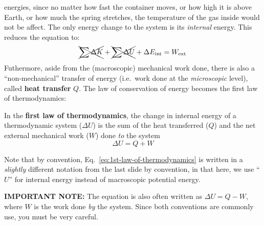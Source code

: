 energies, since no matter how fast the container moves, or how high it is above
Earth, or how much the spring stretches, the temperature of the gas inside would
not be affect. The only energy change to the system is its \emph{internal}
energy. This reduces the equation to:
\begin{equation}
  \xcancel{\sum\Delta K} + \xcancel{\sum\Delta U} + \Delta E_\text{int}=
  W_\text{ext}
\end{equation}
Futhermore, aside from the (macroscopic) mechanical work done, there is also a
``non-mechanical'' transfer of energy (i.e.\ work done at the
\emph{microscopic} level), called \textbf{heat transfer} $Q$. The law of
conservation of energy becomes the first law of thermodynamics:
\begin{definition}
  In the \textbf{first law of thermodynamics}, the change in internal energy of
  a thermodynamic system ($\Delta U$) is the sum of the heat transferred ($Q$)
  and the net external mechanical work ($W$) done \emph{to} the system
  \begin{equation}
    \boxed{
      \Delta U=Q+W
      \label{eq:1st-law-of-thermodynamics}
    }
  \end{equation}
\end{definition}
Note that by convention, Eq.~\ref{eq:1st-law-of-thermodynamics} is written in a
\emph{slightly} different notation from the last slide by convention, in that
here, we use ``$U$'' for internal energy instead of macroscopic potential
energy.

\begin{remark}
  \textbf{IMPORTANT NOTE:} The equation is also often written as
  $\Delta U=Q-W$, where $W$ is the work done \emph{by} the system. Since both
  conventions are commonly use, you must be very careful.
\end{remark}



